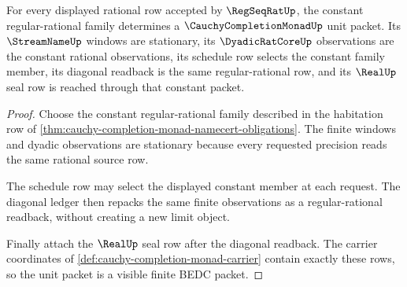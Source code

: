 \begin{theorem}
\label{thm:cauchy-completion-monad-unit-boundary}
For every displayed rational row accepted by $\RegSeqRatUp$, the constant regular-rational family determines a $\CauchyCompletionMonadUp$ unit packet. Its $\StreamNameUp$ windows are stationary, its $\DyadicRatCoreUp$ observations are the constant rational observations, its schedule row selects the constant family member, its diagonal readback is the same regular-rational row, and its $\RealUp$ seal row is reached through that constant packet.
\end{theorem}
\begin{proof}
Choose the constant regular-rational family described in the habitation row of \autoref{thm:cauchy-completion-monad-namecert-obligations}. The finite windows and dyadic observations are stationary because every requested precision reads the same rational source row.

The schedule row may select the displayed constant member at each request. The diagonal ledger then repacks the same finite observations as a regular-rational readback, without creating a new limit object.

Finally attach the $\RealUp$ seal row after the diagonal readback. The carrier coordinates of \autoref{def:cauchy-completion-monad-carrier} contain exactly these rows, so the unit packet is a visible finite BEDC packet.
\end{proof}

